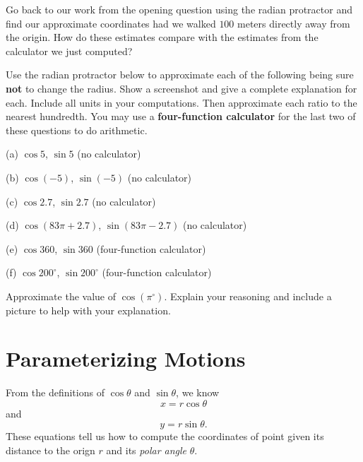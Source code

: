 \documentclass{ximera}
\begin{document}
\begin{question}  \label{QWEREWR:Cosine}
Go back to our work from the opening question using the radian protractor and find our approximate coordinates had we walked $100$ meters directly away from the origin. How do these estimates compare with the estimates from the calculator we just computed?
\end{question}


\begin{exploration}\label{Exp1:CF}
Use the radian protractor below to approximate each of the following being sure {\bf not} to change the radius. Show a screenshot and give a complete explanation for each. Include all units in your computations. Then approximate each ratio to the nearest hundredth. You may use a {\bf four-function calculator} for the last two of these questions to do arithmetic.

(a) $\cos 5$, $\sin 5$  (no calculator)

(b) $\cos (-5)$,  $\sin (-5)$ (no calculator)

(c) $\cos 2.7$, $\sin 2.7$ (no calculator)

(d) $\cos (83\pi + 2.7)$, $\sin (83\pi-2.7)$ (no calculator)

(e) $\cos 360$, $\sin 360$ (four-function calculator)

(f) $\cos 200^\circ$, $\sin 200^\circ$ (four-function calculator)

 
\begin{onlineOnly}
    \begin{center}
\end{center}
\end{onlineOnly}
\end{exploration}

\begin{question} \label{Q2:Cosine}
Approximate the value of $\cos (\pi^\circ)$. Explain your reasoning and include a picture to help with your explanation.
\end{question}


\section{Parameterizing Motions}
From the definitions of $\cos\theta$ and $\sin \theta$, we know
\[
    x = r \cos \theta 
\]
and
\[
      y=r\sin \theta .
\]
These equations tell us how to compute the coordinates of point given its distance to the orign $r$ and its \emph{polar angle} $\theta$.
\end{document}
